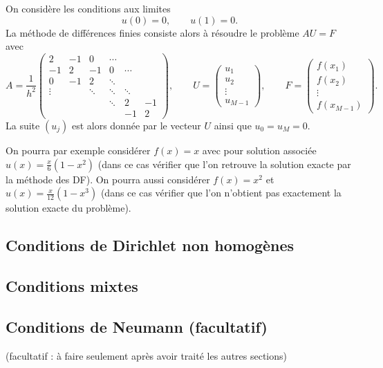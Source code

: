 \documentclass[12pt]{article}
\begin{document}
On consid\`ere les conditions aux limites
\begin{equation}
  \label{eq:Dir_hom}
  u(0) = 0 , \qquad u(1) = 0 .
\end{equation}
La m\'ethode de diff\'erences finies consiste alors \`a r\'esoudre le probl\`eme
$A U = F$ avec
\begin{equation}
  \label{eq:matDir}
  A = \dfrac{1}{h^2} 
  \begin{pmatrix} 
    2 & -1 & 0 & \cdots
    \\
    -1 & 2 & -1 & 0 & \cdots
    \\
    0 & -1 & 2 & \ddots &
    \\
    \vdots & & \ddots & \ddots & \ddots
    \\
    & & &  \ddots & 2 & -1
    \\
    & &  & & -1 & 2
  \end{pmatrix} , \qquad U = 
  \begin{pmatrix}
    u_1 \\ u_2 \\ \vdots \\ u_{M-1}
  \end{pmatrix} , \qquad F = 
  \begin{pmatrix}
    f(x_1) \\ f(x_2) \\ \vdots \\ f(x_{M-1})
  \end{pmatrix} .
\end{equation}
La suite $(u_j)$ est alors donn\'ee par le vecteur $U$ ainsi que $u_0 = u_M = 0$.

On pourra par exemple consid\'erer $f(x)=x$ avec pour solution associ\'ee
$u(x) = \frac{x}{6}(1-x^2)$ (dans ce cas v\'erifier que l'on retrouve la solution exacte
par la m\'ethode des DF).
On pourra aussi consid\'erer $f(x) = x^2$ et $u(x) = \frac{x}{12}(1-x^3)$
(dans ce cas v\'erifier que l'on n'obtient pas exactement la solution exacte du probl\`eme).

\subsection{Conditions de Dirichlet non homog\`enes}

\subsection{Conditions mixtes}

\subsection{Conditions de Neumann (facultatif)}
(facultatif : \`a faire seulement apr\`es avoir trait\'e les autres sections)
\end{document}
